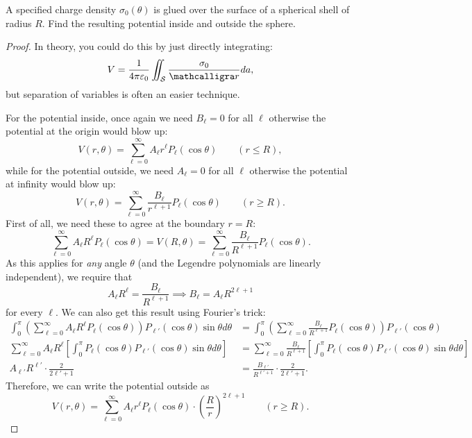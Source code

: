 \begin{example}
A specified charge density $\sigma_0(\theta)$ is glued over the surface of a spherical shell of radius $R$. Find the resulting potential inside and outside the sphere.
\end{example}

\begin{proof}
In theory, you could do this by just directly integrating:
\[V=\frac{1}{4\pi\varepsilon_0}\iint_{\mathcal{S}}\frac{\sigma_0}{\scr}da,\]
but separation of variables is often an easier technique.

For the potential inside, once again we need $B_\ell=0$ for all $\ell$ otherwise the potential at the origin would blow up:
\[V(r,\theta)=\sum_{\ell=0}^\infty A_\ell r^\ell P_\ell(\cos\theta)\qquad (r\le R),\]
while for the potential outside, we need $A_\ell=0$ for all $\ell$ otherwise the potential at infinity would blow up:
\[V(r,\theta)=\sum_{\ell=0}^\infty \frac{B_{\ell}}{r^{\ell+1}}P_\ell(\cos\theta)\qquad (r\ge R).\]
First of all, we need these to agree at the boundary $r=R$:
\[\sum_{\ell=0}^\infty A_\ell R^\ell P_\ell(\cos\theta)=V(R,\theta)=\sum_{\ell=0}^\infty \frac{B_\ell}{R^{\ell+1}}P_\ell(\cos\theta).\]
As this applies for \textit{any} angle $\theta$ (and the Legendre polynomials are linearly independent), we require that
\[A_\ell R^\ell=\frac{B_\ell}{R^{\ell+1}}\implies B_\ell=A_\ell R^{2\ell+1}\]
for every $\ell$. We can also get this result using Fourier's trick:
\begin{align*}
\int_0^\pi \left(\sum_{\ell=0}^\infty A_\ell R^\ell P_\ell(\cos\theta)\right)P_{\ell'}(\cos\theta)\sin\theta d\theta &= \int_0^\pi\left(\sum_{\ell=0}^\infty \frac{B_\ell}{R^{\ell+1}}P_\ell(\cos\theta)\right)P_{\ell'}(\cos\theta)\\
\sum_{\ell=0}^\infty A_\ell R^\ell \left[\int_0^\pi P_\ell(\cos\theta)P_{\ell'}(\cos\theta)\sin\theta d\theta\right]&=\sum_{\ell=0}^\infty \frac{B_\ell}{R^{\ell+1}}\left[\int_0^\pi P_{\ell}(\cos\theta)P_{\ell'}(\cos\theta)\sin\theta d\theta\right]\\
A_{\ell'}R^{\ell'}\cdot\frac{2}{2\ell'+1}&=\frac{B_{\ell'}}{R^{\ell'+1}}\cdot \frac{2}{2\ell'+1}.
\end{align*}
Therefore, we can write the potential outside as
\[V(r,\theta)=\sum_{\ell=0}^\infty A_\ell r^\ell P_\ell(\cos\theta)\cdot \left(\frac{R}{r}\right)^{2\ell+1}\qquad (r\ge R).\]


\end{proof}

